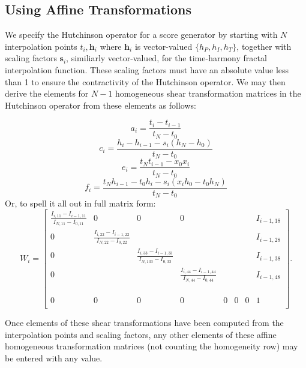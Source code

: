 \documentclass[english,11pt,letterpaper,onecolumn]{scrartcl}
\numberwithin{equation}{section}
\begin{document}
\subsection{Using Affine Transformations}

We specify the Hutchinson operator for a score generator by starting with $N$
interpolation points $t_i, \mathbf{h}_i$ where $\mathbf{h}_i$ is vector-valued
$\{h_P, h_I, h_T\}$, together with scaling factors $\mathbf{s}_i$, similiarly
vector-valued, for the time-harmony fractal interpolation function. These
scaling factors must have an absolute value less than 1 to ensure the
contractivity of the Hutchinson operator. We may then derive the elements for
$N-1$ homogeneous shear transformation matrices in the Hutchinson operator from
these elements as follows:


\[
  a_i = \frac{t_i - t_{i-1}}{t_N - t_0}
\]
\[
  c_i = \frac{h_i - h_{i-1} - s_i (h_N - h_0)}{t_N - t_0}
\]
\[
  e_i = \frac{t_N t_{i-1} - x_0 x_i}{t_N - t_0}
\]
\[
  f_i = \frac{t_N h_{i-1} - t_0 h_i - s_i (x_i h_0 - t_0 h_N)}{t_N - t_0}
\]
\noindent Or, to spell it all out in full matrix form:
\[
  W_i=
  \left[ {\begin{array}{cccccccc}
  \frac{I_{i,11}-I_{i-1,11}}{I_{N,11}-I_{0,11}}              & 0 & 0 & 0 &   &   &   & I_{i-1,18}\\
   0 & \frac{I_{i,22}-I_{i-1,22}}{I_{N,22}-I_{0,22}}             &   &   &   &   &   & I_{i-1,28}\\
   0 &   & \frac{I_{i,33}-I_{i-1,33}}{I_{N,133}-I_{0,33}}            &   &   &   &   & I_{i-1,38}\\
   0 &   &   & \frac{I_{i,44}-I_{i-1,44}}{I_{N,44}-I_{0,44}}             &   &   &   & I_{i-1,48}\\
     &   &   &   &                                                           &   &   &  \\
     &   &   &   &                                                           &   &   &  \\
     &   &   &   &                                                           &   &   &  \\
   0 & 0 & 0 & 0 & 0                                                         & 0 & 0 & 1\\
  \end{array} } \right].
\]

\noindent Once elements of these shear transformations have been computed from
the interpolation points and scaling factors, any other elements of these affine
homogeneous transformation matrices (not counting the homogeneity row) may be
entered with any value.
\end{document}
